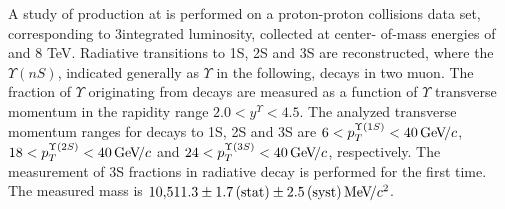 A study of \chib production at \lhcb is performed on a proton-proton collisions
data set, corresponding to 3\invfb integrated luminosity, collected at center-
of-mass energies of  and 8 TeV. Radiative \chib transitions to
\Y1S, \Y2S and \Y3S are reconstructed, where the $\Upsilon(nS)$, indicated generally as $\Upsilon$ in the following, decays in two muon. 
The fraction of $\Upsilon$ originating from \chib decays
are measured as a function of $\Upsilon$ transverse momentum in the \lhcb rapidity range
$2.0 < y^{\Upsilon} < 4.5$. The analyzed transverse momentum ranges for decays
to \Y1S, \Y2S and \Y3S are $6<p_T^{\Y1S}<40\gevc$, $18<p_T^{\Y2S}<40\gevc$ and
$24<p_T^{\Y3S}<40\gevc$, respectively. The measurement of
\Y3S fractions in radiative \chibThreeP decay is performed for the first time.
The measured \chiboneThreeP mass is $10{,}511.3 \pm 1.7\mathrm{\,(stat)} \pm 2.5 \mathrm{\,(syst)} {\mathrm{\,Me\kern -0.1em V\!/}c^2}$.

